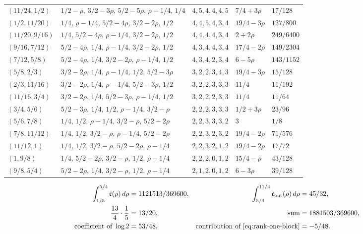 \documentclass{amsart}
\numberwithin{equation}{section}
\numberwithin{table}{section}
\begin{document}
\begin{longtable}{@{}lllll@{}}
$(11/24,1/2)$ & $1/2-\rho,\,3/2-3\rho,\,5/2-5\rho,\,\rho-1/4,\,1/4$ & $4,5,4,4,4,5$ & $7/4+3\rho$ & $17/128$\\
$(1/2,11/20)$ & $1/4,\,\rho-1/4,\,5/2-4\rho,\,3/2-2\rho,\,1/2$ & $4,4,5,4,3,4$ & $19/4-3\rho$ & $127/800$\\
$(11/20,9/16)$ & $1/4,\,5/2-4\rho,\,\rho-1/4,\,3/2-2\rho,\,1/2$ & $4,4,4,4,3,4$ & $2+2\rho$ & $249/6400$\\
$(9/16,7/12)$ & $5/2-4\rho,\,1/4,\,\rho-1/4,\,3/2-2\rho,\,1/2$ & $4,3,4,4,3,4$ & $17/4-2\rho$ & $149/2304$\\
$(7/12,5/8)$ & $5/2-4\rho,\,1/4,\,3/2-2\rho,\,\rho-1/4,\,1/2$ & $4,3,4,2,3,4$ & $6-5\rho$ & $143/1152$\\
$(5/8,2/3)$ & $3/2-2\rho,\,1/4,\,\rho-1/4,\,1/2,\,5/2-3\rho$ & $3,2,2,3,4,3$ & $19/4-3\rho$ & $15/128$\\
$(2/3,11/16)$ & $3/2-2\rho,\,1/4,\,\rho-1/4,\,5/2-3\rho,\,1/2$ & $3,2,2,3,3,3$ & $11/4$ & $11/192$\\
$(11/16,3/4)$ & $3/2-2\rho,\,1/4,\,5/2-3\rho,\,\rho-1/4,\,1/2$ & $3,2,2,2,3,3$ & $11/4$ & $11/64$\\
$(3/4,5/6)$ & $5/2-3\rho,\,1/4,\,1/2,\,\rho-1/4,\,3/2-\rho$ & $2,2,2,3,3,3$ & $1/2+3\rho$ & $23/96$\\
$(5/6,7/8)$ & $1/4,\,1/2,\,\rho-1/4,\,3/2-\rho,\,5/2-2\rho$ & $2,2,3,3,3,2$ & $3$ & $1/8$\\
$(7/8,11/12)$ & $1/4,\,1/2,\,3/2-\rho,\,\rho-1/4,\,5/2-2\rho$ & $2,2,3,2,3,2$ & $19/4-2\rho$ & $71/576$\\
$(11/12,1)$ & $1/4,\,1/2,\,3/2-\rho,\,5/2-2\rho,\,\rho-1/4$ & $2,2,3,2,1,2$ & $19/4-2\rho$ & $17/72$\\
$(1,9/8)$ & $1/4,\,5/2-2\rho,\,3/2-\rho,\,1/2,\,\rho-1/4$ & $2,2,2,0,1,2$ & $15/4-\rho$ & $43/128$\\
$(9/8,5/4)$ & $5/2-2\rho,\,1/4,\,3/2-\rho,\,1/2,\,\rho-1/4$ & $2,1,2,0,1,2$ & $6-3\rho$ & $39/128$\\
\hline
\end{longtable}
\endgroup

\begin{align*}
\int_{1/5}^{5/4}\mathfrak c(\rho)\,d\rho&=1121513/369600,&
\int_{5/4}^{11/4}\mathfrak c_{\rm out}(\rho)\,d\rho&=45/32,\\
\frac{13}{4}\cdot\frac15&=13/20,&
\text{sum}&=1881503/369600,\\
\text{coefficient of }\log2&=53/48,&
\text{contribution of \eqref{eq:rank-one-block}}&=-5/48.
\end{align*}
\end{document}
